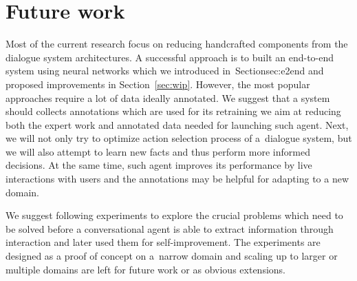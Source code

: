 \documentclass[11pt]{article}
\begin{document}
\section{Future work}\label{sec:future}

Most of the current research focus on reducing handcrafted components from the dialogue system architectures.
A successful approach is to built an end-to-end system using neural networks which we introduced in~Section{sec:e2end} and proposed improvements in Section~\ref{sec:wip}. 
However, the most popular approaches require a lot of data ideally annotated.
We suggest that a system should collects annotations which are used for its retraining we aim at reducing both the expert work and annotated data needed for launching such agent.
Next, we will not only try to optimize action selection process of a~dialogue system, but we will also attempt to learn new facts and thus perform more informed decisions.
At the same time, such agent improves its performance by live interactions with users and the annotations may be helpful for adapting to a new domain.

We suggest following experiments to explore the crucial problems which need to be solved before a conversational agent is able to extract information through interaction and later used them for self-improvement.
The experiments are designed as a proof of concept on a~narrow domain and scaling up to larger or multiple domains are left for future work or as obvious extensions. 
\end{document}
